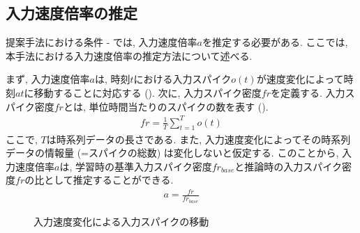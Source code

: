 \subsection{入力速度倍率の推定}
提案手法における条件 - では, 入力速度倍率$a$を推定する必要がある.
ここでは, 本手法における入力速度倍率の推定方法について述べる.

まず, 入力速度倍率$a$は, 時刻$t$における入力スパイク$o(t)$が速度変化によって時刻$at$に移動することに対応する ().
次に, 入力スパイク密度$fr$を定義する.
入力スパイク密度$fr$とは, 単位時間当たりのスパイクの数を表す ().
\begin{align}
    fr = \frac{1}{T} \sum_{t=1}^{T} o(t) \label{eq:input:spike:density}
\end{align}
ここで, $T$は時系列データの長さである.
また, 入力速度変化によってその時系列データの情報量 (=スパイクの総数) は変化しないと仮定する.
このことから, 入力速度倍率$a$は, 学習時の基準入力スパイク密度$fr_{base}$と推論時の入力スパイク密度$fr$の比として推定することができる.
\begin{align}
    a = \frac{fr}{fr_{base}}
\end{align}

\begin{figure}[htbp]
    \centering
    
    \caption{入力速度変化による入力スパイクの移動}
    \label{fig:input:speed:change}
\end{figure}


